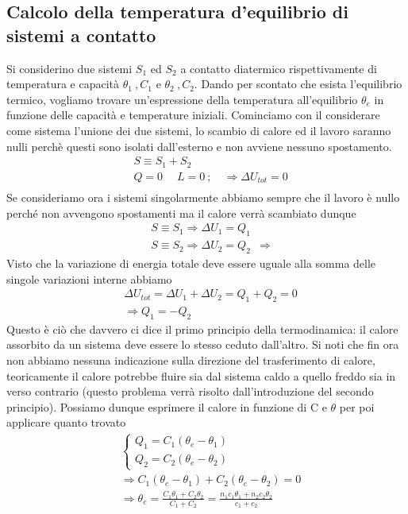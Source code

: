 \documentclass[
10pt, %
a4paper, %
oneside, %
headinclude,footinclude, %
BCOR5mm, %
]{scrartcl}
\begin{document}
\subsection{Calcolo della temperatura d'equilibrio di sistemi a contatto}
Si considerino due sistemi $S_1$ ed $S_2$ a contatto diatermico rispettivamente di temperatura e capacità $\theta_1\ , C_1$ e  $\theta_2\ , C_2$. Dando per scontato che esista l'equilibrio termico, vogliamo trovare un'espressione della temperatura all'equilibrio $\theta_e$ in funzione delle capacità e temperature iniziali. Cominciamo con il considerare come sistema l'unione dei due sistemi, lo scambio di calore ed il lavoro saranno nulli perchè questi sono isolati dall'esterno e non avviene nessuno spostamento. 
\begin{align*} 
	&S \equiv S_1 + S_2\\
	&Q = 0\;\quad L=0\ ; \quad \Rightarrow \Delta U_{tot} = 0\\
\end{align*} 
Se consideriamo ora i sistemi singolarmente abbiamo sempre che il lavoro è nullo perché non avvengono spostamenti ma il calore verrà scambiato dunque
\begin{align*} 
	&S \equiv S_1 \Rightarrow \Delta U_1 = Q_1\\
	&S\equiv S_2 \Rightarrow  \Delta U_2 = Q_2
	&\Rightarrow 
\end{align*} 
Visto che la variazione di energia totale deve essere uguale alla somma delle singole variazioni interne abbiamo
\begin{align*} 
	&\Delta U_{tot} = \Delta U_1 + \Delta U_2 = Q_1+Q_2 = 0\\
	&\Rightarrow Q_1 = -Q_2 
\end{align*}  
Questo è ciò che davvero ci dice il primo principio della termodinamica: il calore assorbito da un sistema deve essere lo stesso ceduto dall'altro. Si noti che fin ora non abbiamo nessuna indicazione sulla direzione del trasferimento di calore, teoricamente il calore potrebbe fluire sia dal sistema caldo a quello freddo sia in verso contrario (questo problema verrà risolto dall'introduzione del secondo principio). Possiamo dunque esprimere il calore in funzione di C e $\theta$ per poi applicare quanto trovato
\begin{align*} 
	&\begin{cases}
		Q_1 = C_1 (\theta_e-\theta_1)\\
		Q_2 = C_2 (\theta_e-\theta_2)
	\end{cases}\\
	&\Rightarrow C_1 (\theta_e-\theta_1) + C_2 (\theta_e-\theta_2) = 0\\
	&\Rightarrow \theta_e = \frac{C_1\theta_1+C_2\theta_2}{C_1+C_2} =  \frac{n_1 c_1\theta_1+n_2 c_2\theta_2}{c_1 + c_2}
\end{align*} 
\end{document}
